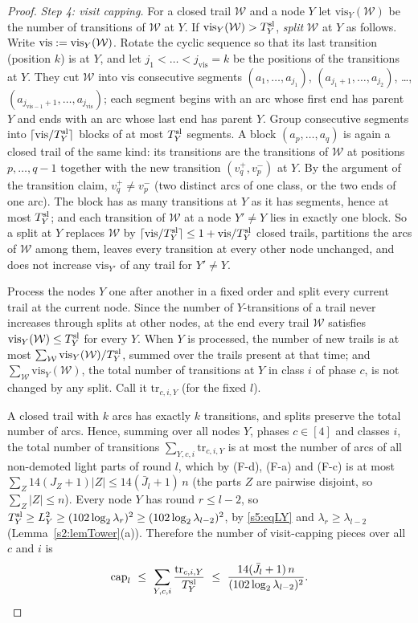 \begin{proof}
\emph{Step 4: visit capping.} For a closed trail $\mathcal W$ and a node $Y$ let $\mathrm{vis}_Y(\mathcal W)$ be the number of transitions of $\mathcal W$ at $Y$. If $\mathrm{vis}_Y(\mathcal W)>T^{\mathrm{sl}}_Y$, \emph{split} $\mathcal W$ at $Y$ as follows. Write $\mathrm{vis}\mathrel{:=}\mathrm{vis}_Y(\mathcal W)$. Rotate the cyclic sequence so that its last transition (position $k$) is at $Y$, and let $j_1<\dots<j_{\mathrm{vis}}=k$ be the positions of the transitions at $Y$. They cut $\mathcal W$ into $\mathrm{vis}$ consecutive segments $(a_1,\dots,a_{j_1})$, $(a_{j_1+1},\dots,a_{j_2})$, \dots, $(a_{j_{\mathrm{vis}-1}+1},\dots,a_{j_{\mathrm{vis}}})$; each segment begins with an arc whose first end has parent $Y$ and ends with an arc whose last end has parent $Y$. Group consecutive segments into $\lceil\mathrm{vis}/T^{\mathrm{sl}}_Y\rceil$ blocks of at most $T^{\mathrm{sl}}_Y$ segments. A block $(a_p,\dots,a_q)$ is again a closed trail of the same kind: its transitions are the transitions of $\mathcal W$ at positions $p,\dots,q-1$ together with the new transition $(v_q^+,v_p^-)$ at $Y$. By the argument of the transition claim, $v_q^+\ne v_p^-$ (two distinct arcs of one class, or the two ends of one arc). The block has as many transitions at $Y$ as it has segments, hence at most $T^{\mathrm{sl}}_Y$; and each transition of $\mathcal W$ at a node $Y'\ne Y$ lies in exactly one block. So a split at $Y$ replaces $\mathcal W$ by $\lceil\mathrm{vis}/T^{\mathrm{sl}}_Y\rceil\le1+\mathrm{vis}/T^{\mathrm{sl}}_Y$ closed trails, partitions the arcs of $\mathcal W$ among them, leaves every transition at every other node unchanged, and does not increase $\mathrm{vis}_{Y'}$ of any trail for $Y'\ne Y$.

Process the nodes $Y$ one after another in a fixed order and split every current trail at the current node. Since the number of $Y$-transitions of a trail never increases through splits at other nodes, at the end every trail $\mathcal W$ satisfies $\mathrm{vis}_Y(\mathcal W)\le T^{\mathrm{sl}}_Y$ for every $Y$. When $Y$ is processed, the number of new trails is at most $\sum_{\mathcal W}\mathrm{vis}_Y(\mathcal W)/T^{\mathrm{sl}}_Y$, summed over the trails present at that time; and $\sum_{\mathcal W}\mathrm{vis}_Y(\mathcal W)$, the total number of transitions at $Y$ in class $i$ of phase $c$, is not changed by any split. Call it $\mathrm{tr}_{c,i,Y}$ (for the fixed $l$).

A closed trail with $k$ arcs has exactly $k$ transitions, and splits preserve the total number of arcs. Hence, summing over all nodes $Y$, phases $c\in[4]$ and classes $i$, the total number of transitions $\sum_{Y,c,i}\mathrm{tr}_{c,i,Y}$ is at most the number of arcs of all non-demoted light parts of round $l$, which by (F-d), (F-a) and (F-c) is at most $\sum_Z14(J_Z+1)|Z|\le14(\bar J_l+1)\,n$ (the parts $Z$ are pairwise disjoint, so $\sum_Z|Z|\le n$). Every node $Y$ has round $r\le l-2$, so $T^{\mathrm{sl}}_Y\ge L_Y^2\ge(102\log_2\lambda_r)^2\ge(102\log_2\lambda_{l-2})^2$, by \eqref{s5:eqLY} and $\lambda_r\ge\lambda_{l-2}$ (Lemma~\ref{s2:lemTower}(a)). Therefore the number of visit-capping pieces over all $c$ and $i$ is
\[
\mathrm{cap}_l\ \le\ \sum_{Y,c,i}\frac{\mathrm{tr}_{c,i,Y}}{\Tslot_Y}\ \le\ \frac{14(\bar J_l+1)\,n}{(102\log_2\lambda_{l-2})^2}.
\]


\end{proof}
